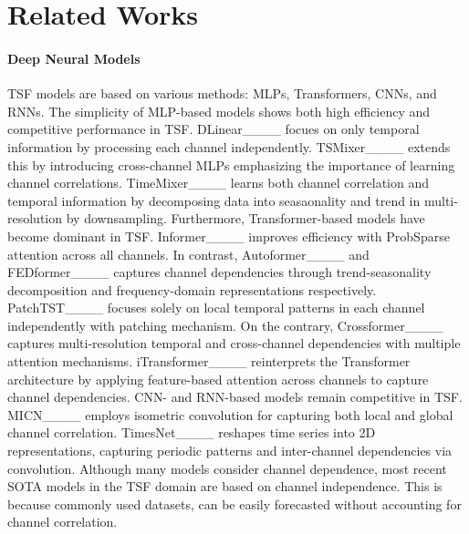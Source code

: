 \section{Related Works}
\label{sec:Related_Works}

\paragraph{\textbf{Deep Neural Models}}
TSF models are based on various methods: MLPs, Transformers, CNNs, and RNNs.
The simplicity of MLP-based models shows both high efficiency and competitive performance in TSF. DLinear____ focues on only temporal information by processing each channel independently. 
TSMixer____ extends this by introducing cross-channel MLPs emphasizing the importance of learning channel correlations.
TimeMixer____ learns both channel correlation and temporal information by decomposing data into seasaonality and trend in multi-resolution by downsampling.
Furthermore, Transformer-based models have become dominant in TSF. Informer____ improves efficiency with ProbSparse attention across all channels. 
In contrast, Autoformer____ and FEDformer____ captures channel dependencies through trend-seasonality decomposition and frequency-domain representations respectively.
PatchTST____ focuses solely on local temporal patterns in each channel independently with patching mechanism. 
On the contrary, Crossformer____ captures multi-resolution temporal and cross-channel dependencies with multiple attention mechanisms.
iTransformer____ reinterprets the Transformer architecture by applying feature-based attention across channels to capture channel dependencies.
CNN- and RNN-based models remain competitive in TSF.
MICN____ employs isometric convolution for capturing both local and global channel correlation.
TimesNet____ reshapes time series into 2D representations, capturing periodic patterns and inter-channel dependencies via convolution.
Although many models consider channel dependence, most recent SOTA models in the TSF domain are based on channel independence.
This is because commonly used datasets, can be easily forecasted without accounting for channel correlation.

